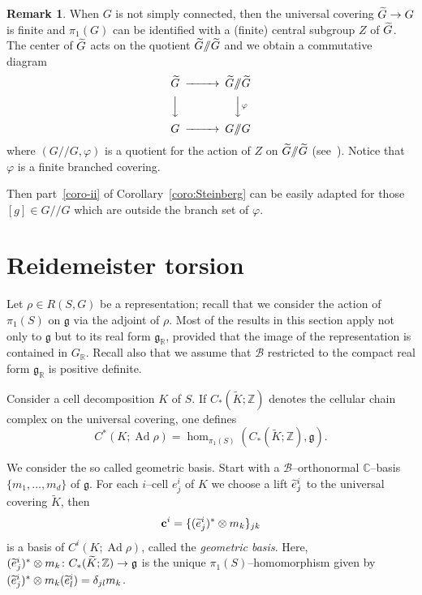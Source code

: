 \documentclass[11pt]{article}
\theoremstyle{definition}
\newtheorem{rema}[theo]{Remark}
\numberwithin{equation}{section}
\numberwithin{figure}{section}
\numberwithin{table}{section}
\DeclareMathOperator{\Ad}{Ad}
\newcommand{\Bcal}{\mathcal{B}}
\newcommand{\Cbb}{\mathbb{C}}
\newcommand{\Zbb}{\mathbb{Z}}
\newcommand{\Rbb}{\mathbb {R}}
\newcommand{\gfrk}{\mathfrak{g}}
\newcommand{\cbf}{\mathbf{c}}
\newcommand*\dG{{d}}
\let\oldtilde\tilde
\renewcommand*{\tilde}[1]{\mathchoice{\widetilde{#1}}{\widetilde{#1}}{\oldtilde{#1}}{\oldtilde{#1}}}\let\oldhat\hat
\renewcommand*{\hat}[1]{\mathchoice{\widehat{#1}}{\widehat{#1}}{\oldhat{#1}}{\oldhat{#1}}}\let\oldforall\forall
\renewcommand*{\forall}{\mathrel{\oldforall}}
\begin{document}
\begin{rema}\label{rem:Gnonsimplyconnected}
When $G$ is not simply connected, then the universal covering $\tilde G\to G$ is finite and $\pi_1(G)$ can be identified with a (finite) central subgroup $Z$ of $\tilde G$. The center of $\tilde G$ acts on the quotient $\tilde G /\!\!/ \tilde G$ and we obtain a commutative diagram
\[
\begin{CD}
\tilde G @>>> \tilde G /\!\!/ \tilde G \\
@VVV @VV{\varphi}V\\
G @>>> G /\!\!/ G
\end{CD}
\]
where $(G/\!\!/ G,\varphi)$ is a quotient for the action of $Z$ on $\tilde G /\!\!/ \tilde G$ (see~\cite[Lemma~2.5]{Popov}). Notice that $\varphi$ is a finite branched covering.

Then part~\eqref{coro-ii} of Corollary~\ref{coro:Steinberg} can be easily adapted for those $[g]\in G/\!\!/ G$ which are outside the branch set of $\varphi$.
\end{rema}



\section{Reidemeister torsion}\label{Section:RT}

Let $\rho\in R(S,G)$ be a representation; recall that we consider the action of $\pi_1(S)$ on $\gfrk$ via the adjoint of $\rho$. Most of the results in this section apply not only to $\gfrk$ but to its real form $\gfrk_{\Rbb}$, provided that the image of the representation is contained in $G_\Rbb$. Recall also that we assume that $\Bcal$ restricted to the compact real form $\gfrk_{\Rbb}$ is positive definite.

Consider a cell decomposition $K$ of $S$. If $C_*(\widetilde K;\Zbb)$ denotes the cellular chain complex on the universal covering, one defines
\begin{equation}\label{eqn:chaincplx}
C^*(K;\Ad\rho)=\hom_{\pi_1(S)}(C_*(\widetilde K;\Zbb), \gfrk).
\end{equation}



We consider the so called geometric basis. Start with a $\Bcal$--orthonormal $\Cbb$--basis $\{m_1,\dots,m_{\dG}\}$ of $\gfrk$. For each $i$--cell $e^i_j$ of $K$ we choose a lift $\tilde e^i_j$ to the universal covering $\widetilde{K}$, then
\[
\cbf^i=\{ (\tilde e^i_j)^*\otimes m_k \}_{jk}
\]
is a basis of $ C^i(K;\Ad\rho)$, called the \emph{geometric basis}. Here, $(\tilde e^i_j)^*\otimes m_k\colon C_*(\widetilde K;\Zbb)\to \gfrk$ is the unique $\pi_1(S)$--homomorphism given by $(\tilde e^i_j)^*\otimes m_k (\tilde e^i_l) =\delta_{jl} m_k$.
\end{document}
